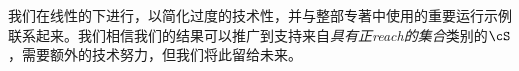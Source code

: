 \documentclass[../../book-main_zh.tex]{subfiles}
\begin{document}
我们在线性的下进行，以简化过度的技术性，并与整部专著中使用的重要运行示例联系起来。我们相信我们的结果可以推广到支持来自\textit{具有正reach的集合}类别的$\cS$，需要额外的技术努力，但我们将此留给未来。

%
%
%
%
\end{document}
